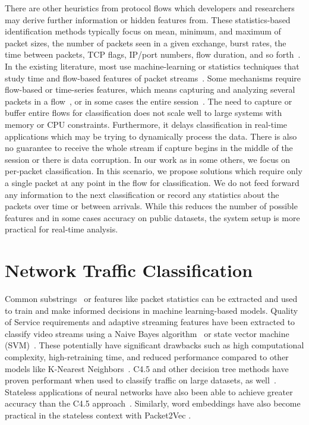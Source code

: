 There are other heuristics from protocol flows which developers and researchers may derive further information or hidden features from. These statistics-based identification methods typically focus on mean, minimum, and maximum of packet sizes, the number of packets seen in a given exchange, burst rates, the time between packets, TCP flags, IP/port numbers, flow duration, and so forth~\cite{Moore2013DiscriminatorsFU, ZHAO202122, Paxson}.
In the existing literature, most use machine-learning or statistics techniques that study time and flow-based features of packet streams~\cite{Salman, Cao, Lim, LiZ, Song2019, iscx-vpn-paper, iscx-tor-paper}. Some mechanisms require flow-based or time-series features, which means capturing and analyzing several packets in a flow~\cite{onlyheader, zhou2018encrypted}, or in some cases the entire session~\cite{perera2017comparison, deeppacket, panchenko2011website, amaral2016machine, cao2014survey, ibrahim2016internet, fan2017investigation, sun2018internet}. The need to capture or buffer entire flows for classification does not scale well to large systems with memory or CPU constraints. Furthermore, it delays classification in real-time applications which may be trying to dynamically process the data. There is also no guarantee to receive the whole stream if capture begins in the middle of the session or there is data corruption. In our work as in some others, we focus on per-packet classification. In this scenario, we propose solutions which require only a single packet at any point in the flow for classification. We do not feed forward any information to the next classification or record any statistics about the packets over time or between arrivals. While this reduces the number of possible features and in some cases accuracy on public datasets, the system setup is more practical for real-time analysis.

\section{Network Traffic Classification}

Common substrings~\cite{sigbox} or features like packet statistics can be extracted and used to train and make informed decisions in machine learning-based models. Quality of Service requirements and adaptive streaming features have been extracted to classify video streams using a Naive Bayes algorithm~\cite{DIAS2019143} or state vector machine (SVM)~\cite{LiZ, Cao}. These potentially have significant drawbacks such as high computational complexity, high-retraining time, and reduced performance compared to other models like K-Nearest Neighbors~\cite{Salman}. C4.5 and other decision tree methods have proven performant when used to classify traffic on large datasets, as well~\cite{Yuan, iscx-vpn-paper}. Stateless applications of neural networks have also been able to achieve greater accuracy than the C4.5 approach~\cite{deeppacket}. Similarly, word embeddings have also become practical in the stateless context with Packet2Vec \cite{packet2vec}.
